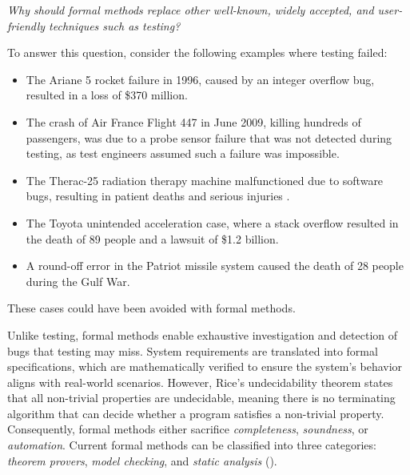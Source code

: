 \begin{center}\em
  Why should formal methods replace other well-known, widely accepted, and user-friendly techniques such as testing?
\end{center}

To answer this question, consider the following examples where testing failed:

\begin{itemize}
\item The Ariane 5 rocket failure in 1996, caused by an integer overflow bug, resulted in a loss of \$370 million.
\item The crash of Air France Flight 447 in June 2009, killing hundreds of passengers, was due to a probe sensor failure that was not detected during testing, as test engineers assumed such a failure was impossible.
\item The Therac-25 radiation therapy machine malfunctioned due to software bugs, resulting in patient deaths and serious injuries .
\item The Toyota unintended acceleration case, where a stack overflow resulted in the death of 89 people and a lawsuit of \$1.2 billion.
\item A round-off error in the Patriot missile system caused the death of 28 people during the Gulf War.
\end{itemize}

These cases could have been avoided with formal methods.

Unlike testing, formal methods enable exhaustive investigation and detection of bugs that testing may miss.
System requirements are translated into formal specifications, which are mathematically verified to ensure the system's behavior aligns with real-world scenarios.
However, Rice's undecidability theorem  states that all non-trivial properties are undecidable, meaning there is no terminating algorithm that can decide whether a program satisfies a non-trivial property.
Consequently, formal methods either sacrifice \emph{completeness}, \emph{soundness}, or \emph{automation}.
Current formal methods can be classified into three categories: \emph{theorem provers}, \emph{model checking}, and \emph{static analysis} ().

